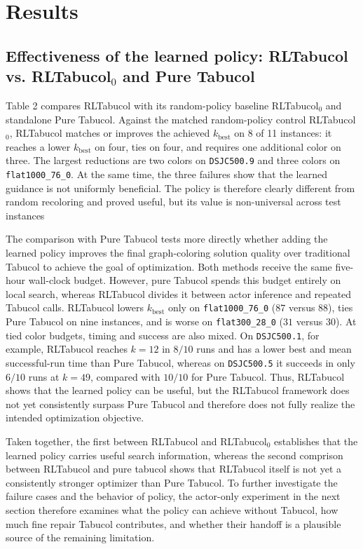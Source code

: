 \section{Results}
\label{sec:results}

\subsection{Effectiveness of the learned policy: RLTabucol vs. RLTabucol$_0$ and Pure Tabucol}
\label{ssec:res-default}

Table 2 compares RLTabucol with its random-policy baseline RLTabucol$_0$ and standalone Pure Tabucol. Against the matched random-policy control RLTabucol$_0$, RLTabucol matches or improves the achieved $k_{\mathrm{best}}$ on 8 of 11 instances: it reaches a lower $k_{\mathrm{best}}$ on four, ties on four, and requires one additional color on three. The largest reductions are two colors on \texttt{DSJC500.9} and three colors on \texttt{flat1000\_76\_0}. At the same time, the three failures show that the learned guidance is not uniformly beneficial. The policy is therefore clearly different from random recoloring and proved useful, but its value is non-universal across test instances

The comparison with Pure Tabucol tests more directly whether adding the learned policy improves the final graph-coloring solution quality over traditional Tabucol to achieve the goal of optimization. Both methods receive the same five-hour wall-clock budget. However, pure Tabucol spends this budget entirely on local search, whereas RLTabucol divides it between actor inference and repeated Tabucol calls. RLTabucol lowers $k_{\mathrm{best}}$ only on \texttt{flat1000\_76\_0} ($87$ versus $88$), ties Pure Tabucol on nine instances, and is worse on \texttt{flat300\_28\_0} ($31$ versus $30$). At tied color budgets, timing and success are also mixed. On \texttt{DSJC500.1}, for example, RLTabucol reaches $k=12$ in $8/10$ runs and has a lower best and mean successful-run time than Pure Tabucol, whereas on \texttt{DSJC500.5} it succeeds in only $6/10$ runs at $k=49$, compared with $10/10$ for Pure Tabucol. Thus, RLTabucol shows that the learned policy can be useful, but the RLTabucol framework does not yet consistently surpass Pure Tabucol and therefore does not fully realize the intended optimization objective.

Taken together, the first between RLTabucol and RLTabucol$_0$ establishes that the learned policy carries useful search information, whereas the second comprison between RLTabucol and pure tabucol shows that RLTabucol itself is not yet a consistently stronger optimizer than Pure Tabucol. To further investigate the failure cases and the behavior of policy, the actor-only experiment in the next section therefore examines what the policy can achieve without Tabucol, how much fine repair Tabucol contributes, and whether their handoff is a plausible source of the remaining limitation.

